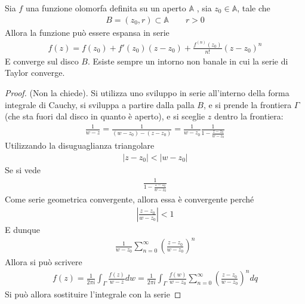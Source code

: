 \documentclass[a4paper, oneside]{article}
\begin{document}
\begin{theorem}
    Sia $f$ una funzione olomorfa definita su un aperto $\mathbb{A}$ , sia $z_0  \in \mathbb{A}$, 
    tale che 
    \begin{gather*}
        B=(z_0, r ) \subset \mathbb{A} \qquad r > 0
    \end{gather*}
    Allora la funzione può essere espansa in serie
    \begin{align}
        f(z) = f(z_0) + f'(z_0) (z - z_0) + \frac{f^{(n)}(z_0)}{n!}(z - z_0)^{n}
    \end{align}
    E converge sul disco $B$. Esiste sempre un intorno non banale in cui 
    la serie di Taylor converge.
\end{theorem}
\begin{proof}
    (Non la chiede). Si utilizza uno sviluppo in serie all'interno della 
    forma integrale di Cauchy, si sviluppa a partire dalla palla $B$, e si prende
    la frontiera $\Gamma$ (che sta fuori dal disco in quanto è aperto), e si sceglie $z$ 
    dentro la frontiera:
    \begin{gather*}
        \frac{1}{w - z} = \frac{1}{(w - z_0) - (z - z_0)} = \frac{1}{w - z_0} \frac{1}{1 - \frac{z - z_0}{w - z_0}}
    \end{gather*}
    Utilizzando la disuguaglianza triangolare
    \begin{gather*}
        \left| z - z_0 \right| < \left| w - z_0 \right|  
    \end{gather*}
    Se si vede 
    \begin{gather*}
        \frac{1}{1 - \frac{z - z_0}{w - z_0}}
    \end{gather*}
    Come serie geometrica convergente, allora essa è convergente 
    perché
    \begin{gather*}
        \left| \frac{z - z_0}{w - z_0} \right| < 1
    \end{gather*}
    E dunque 
    \begin{gather*}
        \frac{1}{w - z_0} \sum_{n = 0}^{\infty } \left(\frac{z - z_0}{w - z_0}\right) ^{n}
    \end{gather*}
    Allora si può scrivere
    \begin{gather*}
        f(z) = \frac{1}{2\pi i} \int_{\Gamma} \frac{f(z)}{w - z} dw = \frac{1}{2\pi i} \int_{\Gamma} \frac{f(w)}{w - z_0} \sum_{n = 0}^{\infty } \left(\frac{z - z_0}{w - z_0}\right)^{n}dq
    \end{gather*}
    Si può allora sostituire l'integrale con la serie

\end{proof}
\end{document}
